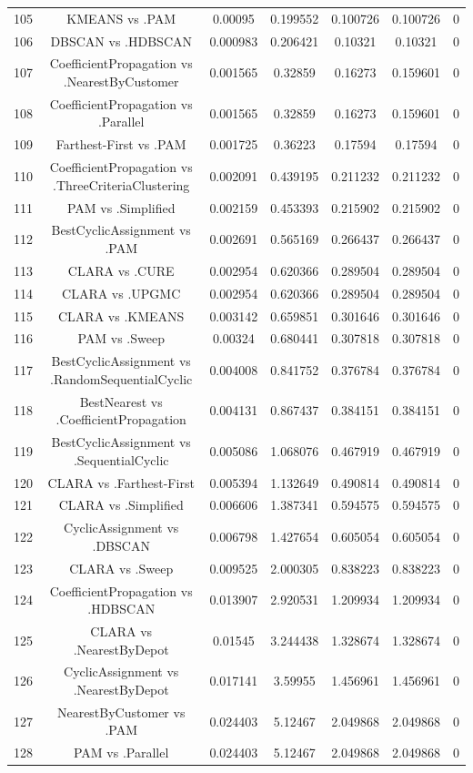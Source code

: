 \documentclass[a4paper,10pt]{article}
\begin{document}
\begin{landscape}
\begin{table}[!htp]
\begin{tabular}{ccccccc}
105&KMEANS vs .PAM&0.00095&0.199552&0.100726&0.100726&0\\
106&DBSCAN vs .HDBSCAN&0.000983&0.206421&0.10321&0.10321&0\\
107&CoefficientPropagation vs .NearestByCustomer&0.001565&0.32859&0.16273&0.159601&0\\
108&CoefficientPropagation vs .Parallel&0.001565&0.32859&0.16273&0.159601&0\\
109&Farthest-First vs .PAM&0.001725&0.36223&0.17594&0.17594&0\\
110&CoefficientPropagation vs .ThreeCriteriaClustering&0.002091&0.439195&0.211232&0.211232&0\\
111&PAM vs .Simplified&0.002159&0.453393&0.215902&0.215902&0\\
112&BestCyclicAssignment vs .PAM&0.002691&0.565169&0.266437&0.266437&0\\
113&CLARA vs .CURE&0.002954&0.620366&0.289504&0.289504&0\\
114&CLARA vs .UPGMC&0.002954&0.620366&0.289504&0.289504&0\\
115&CLARA vs .KMEANS&0.003142&0.659851&0.301646&0.301646&0\\
116&PAM vs .Sweep&0.00324&0.680441&0.307818&0.307818&0\\
117&BestCyclicAssignment vs .RandomSequentialCyclic&0.004008&0.841752&0.376784&0.376784&0\\
118&BestNearest vs .CoefficientPropagation&0.004131&0.867437&0.384151&0.384151&0\\
119&BestCyclicAssignment vs .SequentialCyclic&0.005086&1.068076&0.467919&0.467919&0\\
120&CLARA vs .Farthest-First&0.005394&1.132649&0.490814&0.490814&0\\
121&CLARA vs .Simplified&0.006606&1.387341&0.594575&0.594575&0\\
122&CyclicAssignment vs .DBSCAN&0.006798&1.427654&0.605054&0.605054&0\\
123&CLARA vs .Sweep&0.009525&2.000305&0.838223&0.838223&0\\
124&CoefficientPropagation vs .HDBSCAN&0.013907&2.920531&1.209934&1.209934&0\\
125&CLARA vs .NearestByDepot&0.01545&3.244438&1.328674&1.328674&0\\
126&CyclicAssignment vs .NearestByDepot&0.017141&3.59955&1.456961&1.456961&0\\
127&NearestByCustomer vs .PAM&0.024403&5.12467&2.049868&2.049868&0\\
128&PAM vs .Parallel&0.024403&5.12467&2.049868&2.049868&0\\

\end{tabular}
\end{table}
\end{landscape}
\end{document}
